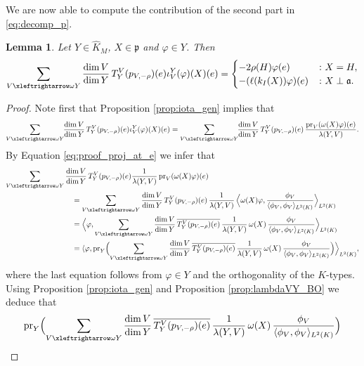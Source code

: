\documentclass[JEP,XML,SOM,NoFloatCountersInSection,Unicode,published]{cedram}
\newtheorem{lemma}[theorem]{Lemma}
\theoremstyle{definition}
\newcommand{\lraomega}{\ensuremath{\xleftrightarrow\omega}}
\newcommand{\mf}[1]{\ensuremath{\mathfrak{#1}}}
\newcommand{\on}[1]{\ensuremath{\operatorname{#1}}}
\newcommand{\rhoa}{\ensuremath{\rho}}
\newcommand{\Ik}[1]{\ensuremath{k_I(#1)}}
\begin{document}
We are now able to compute the contribution of the second part in \eqref{eq:decomp_p}.
\begin{lemma}\label{la:p_second_part}
Let $Y\in\hat K_M$, $X\in\mf p$ and $\varphi\in Y$. Then
\[
\sum_{V\lraomega Y}\frac{\dim V}{\dim Y}\,T_{Y}^V(p_{V,-\rhoa})(e)\iota_V^{Y}(\varphi)(X)(e)=\begin{cases}
-2\rhoa(H)\varphi(e)&\colon X=H,\\
-(\ell(\Ik{X})\varphi)(e)&\colon X\perp\mf a.
\end{cases}
\]
\end{lemma}

\begin{proof}
Note first that Proposition \ref{prop:iota_gen} implies that
\[
\sum_{V\lraomega Y}\hspace*{-1mm}\frac{\dim V}{\dim Y}\,T_{Y}^V(p_{V,-\rhoa})(e)\iota_V^{Y}(\varphi)(X)(e)
=\sum_{V\lraomega Y}\hspace*{-1mm}\frac{\dim V}{\dim Y}\,T_{Y}^V(p_{V,-\rhoa})(e)\,\frac{\on{pr}_V(\omega(X)\varphi)(e)}{\lambda(Y,V)}.
\]
By Equation \eqref{eq:proof_proj_at_e} we infer that
\begin{align*}
\sum_{V\lraomega Y}\frac{\dim V}{\dim Y}&\,T_{Y}^V(p_{V,-\rhoa})(e)\frac{1}{\lambda(Y,V)}\on{pr}_V(\omega(X)\varphi)(e)\\
&\hspace*{-20pt}=\sum_{V\lraomega Y}\frac{\dim V}{\dim Y}\,T_{Y}^V(p_{V,-\rhoa})(e)\,\frac{1}{\lambda(Y,V)}\,\Bigl\langle\omega(X)\varphi,\frac{\phi_V}{\langle\phi_V,\phi_V\rangle_{L^2(K)}}\Bigr\rangle_{L^2(K)}\\
&\hspace*{-20pt}=\Bigl\langle\varphi,\sum_{V\lraomega Y}\frac{\dim V}{\dim Y}\,\overline{T_{Y}^V(p_{V,-\rhoa})(e)}\,\frac{1}{\lambda(Y,V)}\,\omega(X)\,\frac{\phi_V}{\langle\phi_V,\phi_V\rangle_{L^2(K)}}\Bigr\rangle_{L^2(K)}\\
&\hspace*{-20pt}=\langle\varphi,\on{pr}_Y\Bigl(\sum_{V\lraomega Y}\frac{\dim V}{\dim Y}\,\overline{T_{Y}^V(p_{V,-\rhoa})(e)}\,\frac{1}{\lambda(Y,V)}\,\omega(X)\,\frac{\phi_V}{\langle\phi_V,\phi_V\rangle_{L^2(K)}}\Bigr)\Bigr\rangle_{L^2(K)},
\end{align*}
where the last equation follows from $\varphi\in Y$ and the orthogonality of the $K$-types. Using Proposition \ref{prop:iota_gen} and Proposition \ref{prop:lambdaVY_BO} we deduce that
\begin{align*}
\on{pr}_Y\Bigl(\sum_{V\lraomega Y}\frac{\dim V}{\dim Y}&\,\overline{T_{Y}^V(p_{V,-\rhoa})(e)}\,\frac{1}{\lambda(Y,V)}\,\omega(X)\,\frac{\phi_V}{\langle\phi_V,\phi_V\rangle_{L^2(K)}}\Bigr)\\

\end{align*}
\end{proof}
\end{document}
